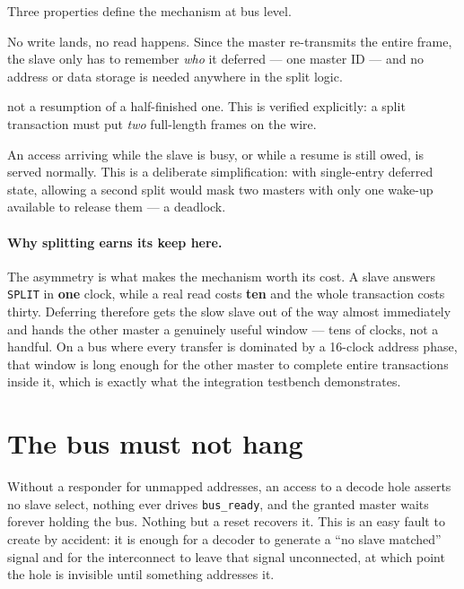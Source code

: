 \documentclass[11pt,a4paper]{article}
\newcommand{\sig}[1]{\texttt{#1}}
\begin{document}
Three properties define the mechanism at bus level.

\begin{description}[leftmargin=1.4em,style=nextline,font=\bfseries]
\item[The deferred transfer is not performed.]
No write lands, no read happens. Since the master re-transmits the entire
frame, the slave only has to remember \emph{who} it deferred --- one master
ID --- and no address or data storage is needed anywhere in the split logic.

\item[The replay is a complete frame,]
not a resumption of a half-finished one. This is verified explicitly: a split
transaction must put \emph{two} full-length frames on the wire.

\item[One split outstanding.]
An access arriving while the slave is busy, or while a resume is still owed,
is served normally. This is a deliberate simplification: with single-entry
deferred state, allowing a second split would mask two masters with only one
wake-up available to release them --- a deadlock.
\end{description}

\paragraph{Why splitting earns its keep here.} The asymmetry is what makes
the mechanism worth its cost. A slave answers \sig{SPLIT} in \textbf{one}
clock, while a real read costs \textbf{ten} and the whole transaction costs
thirty. Deferring therefore gets the slow slave out of the way almost
immediately and hands the other master a genuinely useful window --- tens of
clocks, not a handful. On a bus where every transfer is dominated by a
16-clock address phase, that window is long enough for the other master to
complete entire transactions inside it, which is exactly what the integration
testbench demonstrates.

\section{The bus must not hang}
\label{sec:hang}

Without a responder for unmapped addresses, an access to a decode hole
asserts no slave select, nothing ever drives \sig{bus\_ready}, and the
granted master waits forever holding the bus. Nothing but a reset recovers
it. This is an easy fault to create by accident: it is enough for a decoder
to generate a ``no slave matched'' signal and for the interconnect to leave
that signal unconnected, at which point the hole is invisible until something
addresses it.
\end{document}
